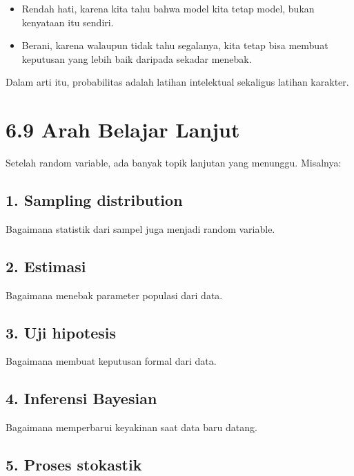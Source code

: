\documentclass[
  letterpaper,
  DIV=11,
  numbers=noendperiod]{scrreprt}
\providecommand{\tightlist}{%
  \setlength{\itemsep}{0pt}\setlength{\parskip}{0pt}}
\begin{document}
\begin{itemize}
\tightlist
\item
  Rendah hati, karena kita tahu bahwa model kita tetap model, bukan
  kenyataan itu sendiri.
\item
  Berani, karena walaupun tidak tahu segalanya, kita tetap bisa membuat
  keputusan yang lebih baik daripada sekadar menebak.
\end{itemize}

Dalam arti itu, probabilitas adalah latihan intelektual sekaligus
latihan karakter.

\section{6.9 Arah Belajar Lanjut}\label{arah-belajar-lanjut}

Setelah random variable, ada banyak topik lanjutan yang menunggu.
Misalnya:

\subsection{1. Sampling distribution}\label{sampling-distribution}

Bagaimana statistik dari sampel juga menjadi random variable.

\subsection{2. Estimasi}\label{estimasi}

Bagaimana menebak parameter populasi dari data.

\subsection{3. Uji hipotesis}\label{uji-hipotesis}

Bagaimana membuat keputusan formal dari data.

\subsection{4. Inferensi Bayesian}\label{inferensi-bayesian}

Bagaimana memperbarui keyakinan saat data baru datang.

\subsection{5. Proses stokastik}\label{proses-stokastik}
\end{document}

